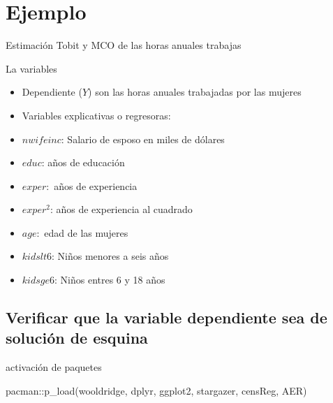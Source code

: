 \documentclass[
  letterpaper,
  DIV=11,
  numbers=noendperiod]{scrreprt}
\newenvironment{Shaded}{\begin{snugshade}}{\end{snugshade}}
\newcommand{\AttributeTok}[1]{\textcolor[rgb]{0.40,0.45,0.13}{#1}}
\newcommand{\CommentTok}[1]{\textcolor[rgb]{0.37,0.37,0.37}{#1}}
\newcommand{\FunctionTok}[1]{\textcolor[rgb]{0.28,0.35,0.67}{#1}}
\newcommand{\NormalTok}[1]{\textcolor[rgb]{0.00,0.23,0.31}{#1}}
\newcommand{\OtherTok}[1]{\textcolor[rgb]{0.00,0.23,0.31}{#1}}
\newcommand{\SpecialCharTok}[1]{\textcolor[rgb]{0.37,0.37,0.37}{#1}}
\newcommand{\StringTok}[1]{\textcolor[rgb]{0.13,0.47,0.30}{#1}}
\begin{document}
\section{Ejemplo}\label{ejemplo}

Estimación Tobit y MCO de las horas anuales trabajas

La variables

\begin{itemize}
\item
  Dependiente (\(Y\)) son las horas anuales trabajadas por las mujeres
\item
  Variables explicativas o regresoras:
\item
  \(nwifeinc\): Salario de esposo en miles de dólares
\item
  \(educ\): años de educación
\item
  \(exper:\) años de experiencia
\item
  \(exper^2\): años de experiencia al cuadrado
\item
  \(age:\) edad de las mujeres
\item
  \(kidslt6\): Niños menores a seis años
\item
  \(kidsge6\): Niños entres 6 y 18 años
\end{itemize}

\subsection{Verificar que la variable dependiente sea de solución de
esquina}\label{verificar-que-la-variable-dependiente-sea-de-soluciuxf3n-de-esquina}

activación de paquetes

\begin{Shaded}
\begin{Highlighting}[]
\NormalTok{pacman}\SpecialCharTok{::}\FunctionTok{p\_load}\NormalTok{(wooldridge, }
\NormalTok{               dplyr, }
\NormalTok{               ggplot2, }
\NormalTok{               stargazer,}
\NormalTok{               censReg,}
\NormalTok{               AER)}
\end{Highlighting}
\end{Shaded}

\begin{Shaded}
\end{Shaded}
\end{document}
